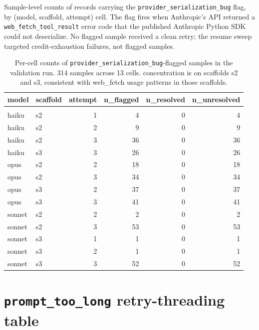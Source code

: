 \documentclass[10pt]{article} %
\begin{document}
    Sample-level counts of records carrying the \texttt{provider\_serialization\_bug} flag, by (model, scaffold, attempt) cell. The flag fires when Anthropic's API returned a \texttt{web\_fetch\_tool\_result} error code that the published Anthropic Python SDK could not deserialize. No flagged sample received a clean retry; the resume sweep targeted credit-exhaustion failures, not flagged samples.
    
    \begin{table}[t]
    \caption{Per-cell counts of \texttt{provider\_serialization\_bug}-flagged samples in the validation run. 314 samples across 13 cells. concentration is on scaffolds s2 and s3, consistent with web\_fetch usage patterns in those scaffolds.}
    \label{tab:provider_bug_summary}
    \begin{center}
    \begin{tabular}{llrrrr}
        \multicolumn{1}{c}{\bf model} &\multicolumn{1}{c}{\bf scaffold} &\multicolumn{1}{c}{\bf attempt} &\multicolumn{1}{c}{\bf n\_flagged} &\multicolumn{1}{c}{\bf n\_resolved} &\multicolumn{1}{c}{\bf n\_unresolved} \\
        \hline \\
        haiku &s2 &1 &4 &0 &4 \\
        haiku &s2 &2 &9 &0 &9 \\
        haiku &s2 &3 &36 &0 &36 \\
        haiku &s3 &3 &26 &0 &26 \\
        opus &s2 &2 &18 &0 &18 \\
        opus &s2 &3 &34 &0 &34 \\
        opus &s3 &2 &37 &0 &37 \\
        opus &s3 &3 &41 &0 &41 \\
        sonnet &s2 &2 &2 &0 &2 \\
        sonnet &s2 &3 &53 &0 &53 \\
        sonnet &s3 &1 &1 &0 &1 \\
        sonnet &s3 &2 &1 &0 &1 \\
        sonnet &s3 &3 &52 &0 &52 \\
    \end{tabular}
    \end{center}
    \end{table}

\section{\texttt{prompt\_too\_long} retry-threading table}
\label{app:prompt_too_long_threading} 
\end{document}
